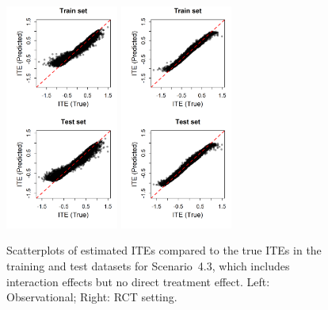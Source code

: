 \begin{figure}[htbp]
\centering
\includegraphics[width=0.33\textwidth]{img/results/observ_scenario3_ITE_scatter_train_test.png}
\includegraphics[width=0.33\textwidth]{img/results/rct_scenario3_ITE_scatter_train_test.png}
\vspace{-17pt}
\caption{Scatterplots of estimated ITEs compared to the true ITEs in the training and test datasets for Scenario~4.3, which includes interaction effects but no direct treatment effect. Left: Observational; Right: RCT setting.}
\label{fig:scenario3_ite_scatter_train_test}
\end{figure}




